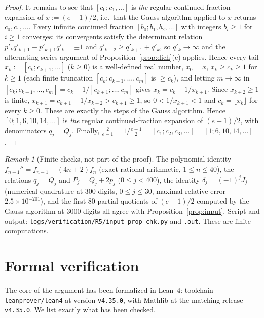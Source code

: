 \documentclass[11pt]{amsart}
\theoremstyle{remark}
\newtheorem{remark}[theorem]{Remark}
\begin{document}
\begin{proof}
It remains to see that $[c_0;c_1,\dots]$ is \emph{the} regular continued-fraction expansion of
$x:=(e-1)/2$, i.e.\ that the Gauss algorithm applied to $x$ returns $c_0,c_1,\dots$. Every infinite continued
fraction $[b_0;b_1,b_2,\dots]$ with integers $b_i\ge1$ for $i\ge1$ converges: its convergents satisfy
the determinant relation $p'_kq'_{k+1}-p'_{k+1}q'_k=\pm1$ and $q'_{k+2}\ge q'_{k+1}+q'_k$, so $q'_k\to\infty$
and the alternating-series argument of Proposition~\ref{prop:dich}(c) applies. Hence every tail
$x_k:=[c_k;c_{k+1},\dots]$ ($k\ge0$) is a well-defined real number, $x_0=x$, $x_k\ge c_k\ge1$ for $k\ge1$
(each finite truncation $[c_k;c_{k+1},\dots,c_m]$ is $\ge c_k$), and letting $m\to\infty$ in
$[c_k;c_{k+1},\dots,c_m]=c_k+1/[c_{k+1};\dots,c_m]$ gives $x_k=c_k+1/x_{k+1}$. Since $x_{k+2}\ge1$ is finite,
$x_{k+1}=c_{k+1}+1/x_{k+2}>c_{k+1}\ge1$, so $0<1/x_{k+1}<1$ and $c_k=\lfloor x_k\rfloor$ for every $k\ge0$.
These are exactly the steps of the Gauss algorithm. Hence $[0;1,6,10,14,\dots]$ is \emph{the} regular continued-fraction
expansion of $(e-1)/2$, with denominators $q_j=Q_j$. Finally, $\frac2{e-1}=1/\frac{e-1}2=[c_1;c_2,c_3,\dots]=[1;6,10,14,\dots]$. \qedhere
\end{proof}

\begin{remark}[Finite checks, not part of the proof]
The polynomial identity $f_{n+1}''=f_{n-1}-(4n+2)f_n$ (exact rational arithmetic, $1\le n\le40$),
the relations $q_j=Q_j$ and $P_j=Q_j+2p_j$ ($0\le j<400$), the identity $\delta_j=(-1)^jJ_j$ (numerical
quadrature at $300$ digits, $0\le j\le30$, maximal relative error $2.5\times10^{-201}$), and the first $80$
partial quotients of $(e-1)/2$ computed by the Gauss algorithm at $3000$ digits all agree with
Proposition~\ref{prop:input}. Script and output: \texttt{logs/verification/R5/input\_prop\_chk.py}
and \texttt{.out}. These are finite computations.
\end{remark}

\section{Formal verification}\label{sec:lean}

The core of the argument has been formalized in Lean~4: toolchain \texttt{leanprover/lean4}
at version \texttt{v4.35.0}, with Mathlib at the matching release \texttt{v4.35.0}.
We list exactly what has been checked.
\end{document}
